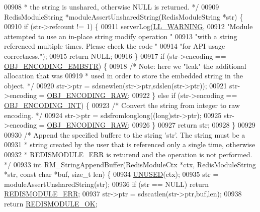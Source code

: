 \begin{DoxyCode}
{00908 \textcolor{comment}{ * the string is unshared, otherwise NULL is returned. */}
00909 RedisModuleString *moduleAssertUnsharedString(RedisModuleString *str) \{
00910     \textcolor{keywordflow}{if} (str->refcount != 1) \{
00911         serverLog(\hyperlink{server_8h_a31229b9334bba7d6be2a72970967a14b}{LL\_WARNING},
00912             \textcolor{stringliteral}{"Module attempted to use an in-place string modify operation "}
00913             \textcolor{stringliteral}{"with a string referenced multiple times. Please check the code "}
00914             \textcolor{stringliteral}{"for API usage correctness."});
00915         \textcolor{keywordflow}{return} NULL;
00916     \}
00917     \textcolor{keywordflow}{if} (str->encoding == \hyperlink{server_8h_ac5bb76b546161fd0da4b0ff89b3142ee}{OBJ\_ENCODING\_EMBSTR}) \{
00918         \textcolor{comment}{/* Note: here we "leak" the additional allocation that was}
00919 \textcolor{comment}{         * used in order to store the embedded string in the object. */}
00920         str->ptr = sdsnewlen(str->ptr,sdslen(str->ptr));
00921         str->encoding = \hyperlink{server_8h_a148bc85e3074e324a6dc5eebcad1bcd5}{OBJ\_ENCODING\_RAW};
00922     \} \textcolor{keywordflow}{else} \textcolor{keywordflow}{if} (str->encoding == \hyperlink{server_8h_ae934cf008a0be0ef009c92c2d006a816}{OBJ\_ENCODING\_INT}) \{
00923         \textcolor{comment}{/* Convert the string from integer to raw encoding. */}
00924         str->ptr = sdsfromlonglong((\textcolor{keywordtype}{long})str->ptr);
00925         str->encoding = \hyperlink{server_8h_a148bc85e3074e324a6dc5eebcad1bcd5}{OBJ\_ENCODING\_RAW};
00926     \}
00927     \textcolor{keywordflow}{return} str;
00928 \}
00929 
00930 \textcolor{comment}{/* Append the specified buffere to the string 'str'. The string must be a}
00931 \textcolor{comment}{ * string created by the user that is referenced only a single time, otherwise}
00932 \textcolor{comment}{ * REDISMODULE\_ERR is returend and the operation is not performed. */}
00933 \textcolor{keywordtype}{int} RM\_StringAppendBuffer(RedisModuleCtx *ctx, RedisModuleString *str, \textcolor{keyword}{const} \textcolor{keywordtype}{char} *buf, size\_t len) \{
00934     \hyperlink{server_8h_ae7c9dc8f13568a9c856573751f1ee1ec}{UNUSED}(ctx);
00935     str = moduleAssertUnsharedString(str);
00936     \textcolor{keywordflow}{if} (str == NULL) \textcolor{keywordflow}{return} \hyperlink{redismodule_8h_a3df6f5bd5247289e66f44437a7cddd49}{REDISMODULE\_ERR};
00937     str->ptr = sdscatlen(str->ptr,buf,len);
00938     \textcolor{keywordflow}{return} \hyperlink{redismodule_8h_a1bc5bfd69abcd378ff52c640adc5418d}{REDISMODULE\_OK};
}
\end{DoxyCode}
